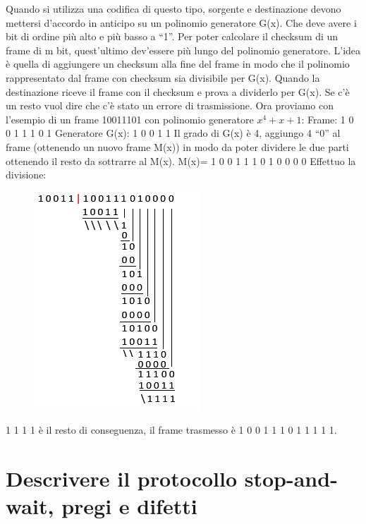 Quando si utilizza una codifica di questo tipo, sorgente e destinazione devono mettersi d’accordo in anticipo su un polinomio generatore G(x). Che deve avere i bit di ordine più alto e più basso a “1”.
Per poter calcolare il checksum di un frame di m bit, quest’ultimo dev’essere più lungo del polinomio generatore. L’idea è quella di aggiungere un checksum alla fine del frame in modo che il polinomio rappresentato dal frame con checksum sia divisibile per G(x). Quando la destinazione riceve il frame con il checksum e prova a dividerlo per G(x). Se c’è un resto vuol dire che c’è stato un errore di trasmissione.
Ora proviamo con l’esempio di un frame 10011101 con polinomio generatore $x^4+x+1$:
Frame: 1 0 0 1 1 1 0 1 
Generatore G(x): 1 0 0 1 1
Il grado di G(x) è 4, aggiungo 4 “0” al frame (ottenendo un nuovo frame M(x)) in modo da poter dividere le due parti ottenendo il resto da sottrarre al M(x).
M(x)= 1 0 0 1 1 1 0 1 0 0 0 0
Effettuo la divisione: 

\begin{figure}[H]
\centering
\includegraphics[scale=0.65]{res/img/16_DivisioneEsCRC.png}
\end{figure}
             
1 1 1 1 è il resto di conseguenza, il frame trasmesso è 1 0 0 1  1 1 0 1  1 1 1 1.

\section{Descrivere il protocollo stop-and-wait, pregi e difetti}

